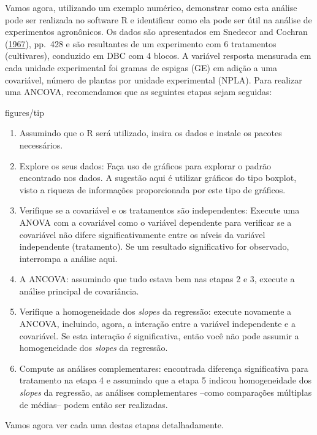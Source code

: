 \documentclass[
]{book}
\numberwithin{equation}{section}
\newcommand{\indt}[1]{\index{#1|ST}}
\newenvironment{dica}
  {\begin{customBlockImage}[colframe=customBlue, title=Dica]{figures/tip}}
  {\end{customBlockImage}}
\begin{document}
Vamos agora, utilizando um exemplo numérico, demonstrar como esta análise pode ser realizada no software R e identificar como ela pode ser útil na análise de experimentos agronônicos. Os dados são apresentados em Snedecor and Cochran (\protect\hyperlink{ref-Snedecor1967}{1967}), pp.~428 e são resultantes de um experimento com 6 tratamentos (cultivares), conduzido em DBC com 4 blocos. A variável resposta mensurada em cada unidade experimental foi gramas de espigas (GE) em adição a uma covariável, número de plantas por unidade experimental (NPLA). Para realizar uma ANCOVA, recomendamos que as seguintes etapas sejam seguidas:

\indt{Dicas}
\begin{dica}
\begin{enumerate}
\def\labelenumi{\arabic{enumi}.}
\item
  Assumindo que o R será utilizado, insira os dados e instale os pacotes necessários.
\item
  Explore os seus dados: Faça uso de gráficos para explorar o padrão encontrado nos dados. A sugestão aqui é utilizar gráficos do tipo boxplot, visto a riqueza de informações proporcionada por este tipo de gráficos.
\item
  Verifique se a covariável e os tratamentos são independentes: Execute uma ANOVA\indt{ANOVA} com a covariável como o variável dependente para verificar se a covariável não difere significativamente entre os níveis da variável independente (tratamento). Se um resultado significativo for observado, interrompa a análise aqui.
\item
  A ANCOVA: assumindo que tudo estava bem nas etapas 2 e 3, execute a análise principal de covariância.
\item
  Verifique a homogeneidade dos \emph{slopes} da regressão: execute novamente a ANCOVA, incluindo, agora, a interação entre a variável independente e a covariável. Se esta interação é significativa, então você não pode assumir a homogeneidade dos \emph{slopes} da regressão.
\item
  Compute as análises complementares: encontrada diferença significativa para tratamento na etapa 4 e assumindo que a etapa 5 indicou homogeneidade dos \emph{slopes} da regressão, as análises complementares --como comparações múltiplas de médias-- podem então ser realizadas.
\end{enumerate}
\end{dica}

Vamos agora ver cada uma destas etapas detalhadamente.
\end{document}
